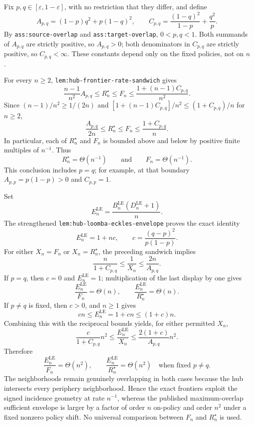 Fix \(p,q\in[\varepsilon,1-\varepsilon]\), with no restriction that they differ, and define
\[
 A_{p,q}=(1-p)q^2+p(1-q)^2,
 \qquad
 C_{p,q}=\frac{(1-q)^2}{1-p}+\frac{q^2}{p}.
\]
By \texttt{ass:source-overlap} and \texttt{ass:target-overlap}, \(0<p,q<1\).  Both summands of \(A_{p,q}\) are strictly positive, so \(A_{p,q}>0\); both denominators in \(C_{p,q}\) are strictly positive, so \(C_{p,q}<\infty\).  These constants depend only on the fixed policies, not on \(n\).

For every \(n\ge2\), \texttt{lem:hub-frontier-rate-sandwich} gives
\[
 \frac{n-1}{n^2}A_{p,q}
 \le R_n^{\star}\le F_n
 \le\frac{1+(n-1)C_{p,q}}{n^2}.
\]
Since \((n-1)/n^2\ge1/(2n)\) and
\(
 [1+(n-1)C_{p,q}]/n^2\le(1+C_{p,q})/n
\) for \(n\ge2\),
\[
 \frac{A_{p,q}}{2n}
 \le R_n^{\star}\le F_n
 \le\frac{1+C_{p,q}}{n}.
\]
In particular, each of \(R_n^{\star}\) and \(F_n\) is bounded above and below by positive finite multiples of \(n^{-1}\).  Thus
\[
 R_n^{\star}=\Theta(n^{-1})
 \qquad\text{and}\qquad
 F_n=\Theta(n^{-1}).
\]
This conclusion includes \(p=q\); for example, at that boundary \(A_{p,p}=p(1-p)>0\) and \(C_{p,p}=1\).

Set
\[
 E_n^{\mathrm{LE}}
 =\frac{B_n^{\mathrm{LE}}(D_n^{\mathrm{LE}}+1)}{n}.
\]
The strengthened \texttt{lem:hub-loomba-eckles-envelope} proves the exact identity
\[
 E_n^{\mathrm{LE}}
 =1+n c,
 \qquad
 c=\frac{(q-p)^2}{p(1-p)}.
\]
For either \(X_n=F_n\) or \(X_n=R_n^{\star}\), the preceding sandwich implies
\[
 \frac{n}{1+C_{p,q}}
 \le \frac{1}{X_n}
 \le \frac{2n}{A_{p,q}}.
\]
If \(p=q\), then \(c=0\) and \(E_n^{\mathrm{LE}}=1\); multiplication of the last display by one gives
\[
 \frac{E_n^{\mathrm{LE}}}{F_n}=\Theta(n),
 \qquad
 \frac{E_n^{\mathrm{LE}}}{R_n^{\star}}=\Theta(n).
\]
If \(p\ne q\) is fixed, then \(c>0\), and \(n\ge1\) gives
\[
 cn\le E_n^{\mathrm{LE}}=1+cn\le(1+c)n.
\]
Combining this with the reciprocal bounds yields, for either permitted \(X_n\),
\[
 \frac{c}{1+C_{p,q}}n^2
 \le \frac{E_n^{\mathrm{LE}}}{X_n}
 \le \frac{2(1+c)}{A_{p,q}}n^2.
\]
Therefore
\[
 \frac{E_n^{\mathrm{LE}}}{F_n}=\Theta(n^2),
 \qquad
 \frac{E_n^{\mathrm{LE}}}{R_n^{\star}}=\Theta(n^2)
 \quad\text{when fixed }p\ne q.
\]
The neighborhoods remain genuinely overlapping in both cases because the hub intersects every periphery neighborhood.  Hence the exact frontiers exploit the signed incidence geometry at rate \(n^{-1}\), whereas the published maximum-overlap sufficient envelope is larger by a factor of order \(n\) on-policy and order \(n^2\) under a fixed nonzero policy shift.  No universal comparison between \(F_n\) and \(R_n^{\star}\) is used.